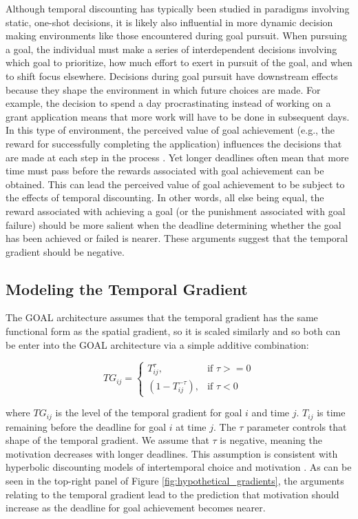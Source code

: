 \documentclass[a4paper,doc,natbib,donotrepeattitle]{apa6}
\begin{document}
Although temporal discounting has typically been studied in paradigms involving static, one-shot decisions, it is likely also influential in more dynamic decision making environments like those encountered during goal pursuit. When pursuing a goal, the individual must make a series of interdependent decisions involving which goal to prioritize, how much effort to exert in pursuit of the goal, and when to shift focus elsewhere. Decisions during goal pursuit have downstream effects because they shape the environment in which future choices are made. For example, the decision to spend a day procrastinating instead of working on a grant application means that more work will have to be done in subsequent days. In this type of environment, the perceived value of goal achievement (e.g., the reward for successfully completing the application) influences the decisions that are made at each step in the process \citep{Ballard2018}. Yet longer deadlines often mean that more time must pass before the rewards associated with goal achievement can be obtained. This can lead the perceived value of goal achievement to be subject to the effects of temporal discounting. In other words, all else being equal, the reward associated with achieving a goal (or the punishment associated with goal failure) should be more salient when the deadline determining whether the goal has been achieved or failed is nearer. These arguments suggest that the temporal gradient should be negative.

\subsection{Modeling the Temporal Gradient}

The GOAL architecture assumes that the temporal gradient has the same functional form as the spatial gradient, so it is scaled similarly and so both can be enter into the GOAL architecture via a simple additive combination:

\begin{equation}
TG_{ij} =
\begin{cases}
T_{ij}^\tau, & \text{if } \tau >= 0 \\
(1-T_{ij}^{-\tau}), & \text{if } \tau < 0
\end{cases}
\end{equation}

\noindent where $TG_{ij}$ is the level of the temporal gradient for goal $i$ and time $j$. $T_{ij}$ is time remaining before the deadline for goal $i$ at time $j$. The $\tau$ parameter controls that shape of the temporal gradient. We assume that $\tau$ is negative, meaning the motivation decreases with longer deadlines. This assumption is consistent with hyperbolic discounting models of intertemporal choice and motivation \citep[e.g.,][]{Ainslie1975,Steel2006}. As can be seen in the top-right panel of Figure \ref{fig:hypothetical_gradients}, the arguments relating to the temporal gradient lead to the prediction that motivation should increase as the deadline for goal achievement becomes nearer.
\end{document}
